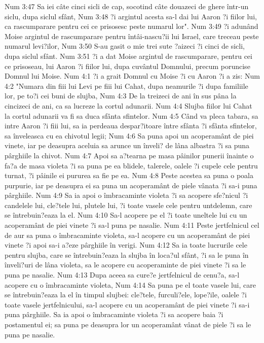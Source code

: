 Num 3:47  Sa iei câte cinci sicli de cap, socotind câte douazeci de ghere într-un siclu, dupa siclul sfânt,
Num 3:48  ?i argintul acesta sa-l dai lui Aaron ?i fiilor lui, ca rascumparare pentru cei ce prisosesc peste numarul lor".
Num 3:49  ?i adunând Moise argintul de rascumparare pentru întâi-nascu?ii lui Israel, care treceau peste numarul levi?ilor,
Num 3:50  S-au gasit o mie trei sute ?aizeci ?i cinci de sicli, dupa siclul sfânt.
Num 3:51  ?i a dat Moise argintul de rascumparare, pentru cei ce prisoseau, lui Aaron ?i fiilor lui, dupa cuvântul Domnului, precum poruncise Domnul lui Moise.
Num 4:1  ?i a grait Domnul cu Moise ?i cu Aaron ?i a zis:
Num 4:2  "Numara din fiii lui Levi pe fiii lui Cahat, dupa neamurile ?i dupa familiile lor, pe to?i cei buni de slujba,
Num 4:3  De la treizeci de ani în sus pâna la cincizeci de ani, ca sa lucreze la cortul adunarii.
Num 4:4  Slujba fiilor lui Cahat la cortul adunarii va fi sa duca sfânta sfintelor.
Num 4:5  Când va pleca tabara, sa intre Aaron ?i fiii lui, sa ia perdeaua despar?itoare între sfânta ?i sfânta sfintelor, sa înveleasca cu ea chivotul legii;
Num 4:6  Sa puna apoi un acoperamânt de piei vinete, iar pe deasupra aceluia sa arunce un înveli? de lâna albastra ?i sa puna pârghiile la chivot.
Num 4:7  Apoi sa a?tearna pe masa pâinilor punerii înainte o fa?a de masa violeta ?i sa puna pe ea blidele, talerele, oalele ?i cupele cele pentru turnat, ?i pâinile ei pururea sa fie pe ea.
Num 4:8  Peste acestea sa puna o poala purpurie, iar pe deasupra ei sa puna un acoperamânt de piele vânata ?i sa-i puna pârghiile.
Num 4:9  Sa ia apoi o îmbracaminte violeta ?i sa acopere sfe?nicul ?i candelele lui, cle?tele lui, plutele lui, ?i toate vasele cele pentru untdelemn, care se întrebuin?eaza la el.
Num 4:10  Sa-l acopere pe el ?i toate uneltele lui cu un acoperamânt de piei vinete ?i sa-l puna pe nasalie.
Num 4:11  Peste jertfelnicul cel de aur sa puna o îmbracaminte violeta, sa-l acopere cu un acoperamânt de piei vinete ?i apoi sa-i a?eze pârghiile în verigi.
Num 4:12  Sa ia toate lucrurile cele pentru slujba, care se întrebuin?eaza la slujba în loca?ul sfânt, ?i sa le puna în înveli?uri de lâna violeta, sa le acopere cu acoperaminte de piei vinete ?i sa le puna pe nasalie.
Num 4:13  Dupa aceea sa cure?e jertfelnicul de cenu?a, sa-l acopere cu o îmbracaminte violeta,
Num 4:14  Sa puna pe el toate vasele lui, care se întrebuin?eaza la el în timpul slujbei: cle?tele, furculi?ele, lope?ile, oalele ?i toate vasele jertfelnicului, sa-l acopere cu un acoperamânt de piei vinete ?i sa-i puna pârghiile. Sa ia apoi o îmbracaminte violeta ?i sa acopere baia ?i postamentul ei; sa puna pe deasupra lor un acoperamânt vânat de piele ?i sa le puna pe nasalie.
